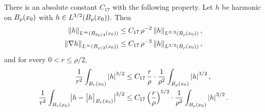 \documentclass[11pt,reqno]{amsart}
\begin{document}
\begin{lemma}\label{lem:harmonic-interior}
There is an absolute constant $C_{17}$ with the following property. Let
$h$ be harmonic on $B_{\rho}(x_{0})$ with $h\in L^{3/2}(B_{\rho}(x_{0}))$.
Then
\begin{align}
  \left\lVert h \right\rVert_{L^{\infty}(B_{3\rho/4}(x_{0}))}
    &\le C_{17}\,\rho^{-2}\left\lVert h \right\rVert_{L^{3/2}(B_{\rho}(x_{0}))},
    \label{eq:harm-sup}\\
  \left\lVert \nabla h \right\rVert_{L^{\infty}(B_{\rho/2}(x_{0}))}
    &\le C_{17}\,\rho^{-3}\left\lVert h \right\rVert_{L^{3/2}(B_{\rho}(x_{0}))},
    \label{eq:harm-grad}
\end{align}
and for every $0<r\le\rho/2$,
\begin{align}
  \frac1{r^{2}}\int_{B_{r}(x_{0})}\left\lvert h \right\rvert^{3/2}
    &\le C_{17}\,\frac r\rho\cdot\frac1{\rho^{2}}
       \int_{B_{\rho}(x_{0})}\left\lvert h \right\rvert^{3/2},
    \label{eq:harm-decay-plain}\\
  \frac1{r^{2}}\int_{B_{r}(x_{0})}
     \bigl|h-\bigl[h\bigr]_{B_{r}(x_{0})}\bigr|^{3/2}
    &\le C_{17}\,\Bigl(\frac r\rho\Bigr)^{5/2}\cdot\frac1{\rho^{2}}
       \int_{B_{\rho}(x_{0})}\left\lvert h \right\rvert^{3/2}.
    \label{eq:harm-decay-osc}
\end{align}
\end{lemma}
\end{document}

